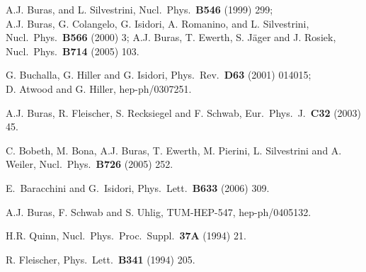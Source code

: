 \documentclass[12pt]{article}
\begin{document}
\begin{thebibliography}{999}
A.J. Buras, and L. Silvestrini,
{ Nucl.\ Phys.}~{\bf B546} (1999) 299;\\
A.J. Buras, G. Colangelo, G. Isidori, A. Romanino, and L. Silvestrini,
{ Nucl.\ Phys.}~{\bf B566} (2000) 3;
A.J. Buras, T. Ewerth, S. J\"ager and J. Rosiek,
{ Nucl.\ Phys.}~{\bf B714} (2005) 103.

G. Buchalla, G. Hiller and G. Isidori,
{ Phys.\ Rev.}~{\bf D63} (2001) 014015;\\
D. Atwood and G. Hiller,
hep-ph/0307251.

A.J. Buras, R. Fleischer, S. Recksiegel and F. Schwab,
{ Eur.\ Phys.\ J.}~{\bf C32} (2003) 45.

C. Bobeth, M. Bona, A.J. Buras, T. Ewerth, M. Pierini, L. Silvestrini and A. Weiler,
  { Nucl.\ Phys.}~{\bf B726} (2005) 252.

E.~Baracchini and G.~Isidori,
  Phys.\ Lett.\  {\bf B633} (2006) 309.

A.J. Buras, F. Schwab and S. Uhlig,
TUM-HEP-547, hep-ph/0405132.

H.R. Quinn,
{ Nucl.\ Phys.\ Proc.\ Suppl.}~{\bf 37A} (1994) 21.

R. Fleischer,
{ Phys.\ Lett.}~{\bf B341} (1994) 205.


\end{thebibliography}
\end{document}
